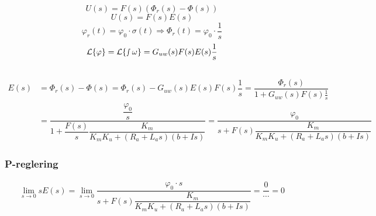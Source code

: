 \documentclass[11pt]{article}
\begin{document}
\begin{equation}
U(s) = F(s)(\Phi_r(s)-\Phi(s))
\end{equation}
\begin{equation}
U(s) = F(s)E(s)
\end{equation}
\begin{equation}
\varphi_r(t)= \varphi_0\cdot\sigma(t) \Rightarrow
\Phi_r(t)=\varphi_0\cdot\dfrac{1}{s}
\end{equation} 
\begin{equation}
\mathcal{L}\{\varphi\}=\mathcal{L}\{\smallint\omega \} = G_{uw}(s)F(s)E(s)\dfrac{1}{s}
\end{equation}\\[1em]
\begin{equation*}
\begin{split}
E(s)&=\Phi_r(s)-\Phi(s)=\Phi_r(s)-G_{uw}(s)E(s)F(s)\dfrac{1}{s} = \dfrac{\Phi_r(s)}{1+G_{uw}(s)F(s)\frac{1}{s}}\\
&=\dfrac{\dfrac{\varphi_0}{s}}{1+\dfrac{F(s)}{s}\dfrac{K_m}{K_mK_u+(R_a+L_as)(b+Is)}} = \dfrac{\varphi_0}{s+F(s)\dfrac{K_m}{K_mK_u+(R_a+L_as)(b+Is)}}
\end{split}
\end{equation*}
\subsubsection{P-reglering}
\begin{equation*}
\begin{split}
\lim_{s \to 0}sE(s) =\lim_{s \to 0} \dfrac{\varphi_0\cdot s}{s+F(s)\dfrac{K_m}{K_mK_u+(R_a+L_as)(b+Is)}} = \dfrac{0}{\cdots} = 0
\end{split}
\end{equation*}
\end{document}
